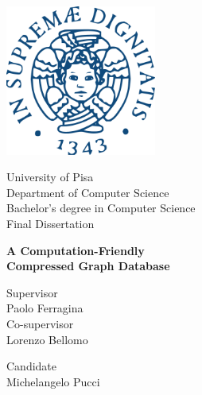 
\centering\includegraphics[width=140pt]{unipi_logo.pdf}


\begin{center}
    {\Large{University of Pisa\\}}
    {\large{Department of Computer Science}\\}
    {\large {Bachelor's degree in Computer Science}}\\

    \vspace{2cm}
    {\large{Final Dissertation}}

    \centering
    \vfill
    {\LARGE \textbf{A Computation-Friendly\\ Compressed Graph Database}}
    \vfill
\end{center}

\vspace{3.75cm}

\begin{minipage}[t]{0.47\textwidth}
  {\large Supervisor\\ Paolo Ferragina}\\[0.5cm]
  {\large Co-supervisor\\ Lorenzo Bellomo}
\end{minipage}
\hfill
\begin{minipage}[t]{0.47\textwidth}
  \raggedleft
  {\large Candidate\\ Michelangelo Pucci}
\end{minipage}

\vspace{20mm}

